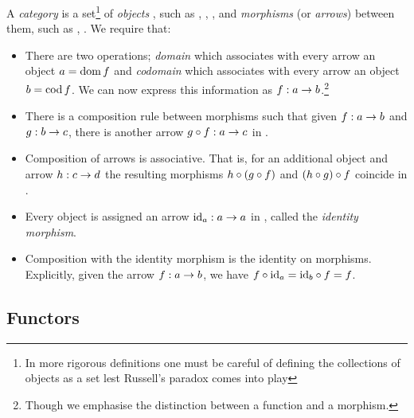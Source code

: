 \begin{categorydef}
  A \emph{category}  is a set\footnote{In more rigorous definitions one must be careful of defining the collections of objects as a set lest Russell's paradox comes into play} of \emph{objects} , such as , , , and \emph{morphisms} (or \emph{arrows})  between them, such as , . We require that:
  \begin{itemize}
    \item There are two operations; \emph{domain} which associates with every arrow  an object $\mathnormal{a} = \mathrm{dom}\,\mathnormal{f}$ and \emph{codomain} which associates with every arrow  an object $\mathnormal{b} = \mathrm{cod}\,\mathnormal{f}$. We can now express this information as $\mathnormal{f}: \mathnormal{a} \to \mathnormal{b}$.\footnote{Though we emphasise the distinction between a function and a morphism.}
    \item There is a composition rule between morphisms such that given $\mathnormal{f}: \mathnormal{a} \to \mathnormal{b}$ and $\mathnormal{g}: \mathnormal{b} \to \mathnormal{c}$, there is another arrow $\mathnormal{g} \circ \mathnormal{f}: \mathnormal{a} \to \mathnormal{c}$ in .
    \item Composition of arrows is associative. That is, for an additional object  and arrow $\mathnormal{h}: \mathnormal{c} \to \mathnormal{d}$ the resulting morphisms $\mathnormal{h} \circ \left(\mathnormal{g} \circ \mathnormal{f}\right)$ and $\left(\mathnormal{h} \circ \mathnormal{g}\right) \circ \mathnormal{f}$ coincide in .
    \item Every object  is assigned an arrow $\mathrm{id}_{\mathnormal{a}}: \mathnormal{a} \to \mathnormal{a}$ in , called the \emph{identity morphism}.
    \item Composition with the identity morphism is the identity on morphisms. Explicitly, given the arrow $\mathnormal{f}: \mathnormal{a} \to \mathnormal{b}$, we have $\mathnormal{f} \circ \mathrm{id}_{\mathnormal{a}} = \mathrm{id}_{\mathnormal{b}} \circ \mathnormal{f} = \mathnormal{f}$.
  \end{itemize}
\end{categorydef}

\subsection{Functors}
\theoremstyle{definition}\newtheorem*{covfunctordef}{Functor}

